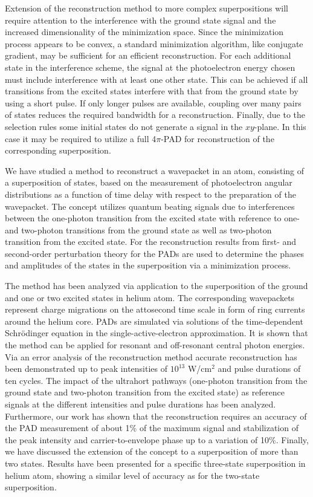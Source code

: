 Extension of the reconstruction method to more complex superpositions will require attention to the interference with the ground state signal and the increased dimensionality of the minimization space. Since the minimization process appears to be convex, a standard minimization algorithm, like conjugate gradient, may be sufficient for an efficient reconstruction. For each additional state in the interference scheme, the signal at the photoelectron energy chosen must include interference with at least one other state. This can be achieved if all transitions from the excited states interfere with that from the ground state by using a short pulse. If only longer pulses are available, coupling over many pairs of states reduces the required bandwidth for a reconstruction. Finally, due to the selection rules some initial states do not generate a signal in the $xy$-plane. In this case it may be required to utilize a full 4$\pi$-PAD for reconstruction of the corresponding superposition.


We have studied a method to reconstruct a wavepacket in an atom, consisting of a superposition of states, based on the measurement of photoelectron angular distributions as a function of time delay with respect to the preparation of the wavepacket. The concept utilizes quantum beating signals due to interferences between the one-photon transition from the excited state with reference to one- and two-photon transitions from the ground state as well as two-photon transition from the excited state. For the reconstruction results from first- and second-order perturbation theory for the PADs are used to determine the phases and amplitudes of the states in the superposition via a minimization process.

The method has been analyzed via application to the superposition of the ground and one or two excited states in helium atom. The corresponding wavepackets represent charge migrations on the attosecond time scale in form of ring currents around the helium core. PADs are simulated via solutions of the time-dependent Schr\"odinger equation in the single-active-electron approximation. It is shown that the method can be applied for resonant and off-resonant central photon energies. Via an error analysis of the reconstruction method accurate reconstruction has been demonstrated up to peak intensities of $10^{13}$ W/cm$^2$ and pulse durations of ten cycles. The impact of the ultrahort pathways (one-photon transition from the ground state and two-photon transition from the excited state) as reference signals at the different intensities and pulse durations has been analyzed. Furthermore, our work has shown that the reconstruction requires an accuracy of the PAD measurement of about 1\% of the maximum signal and stabilization of the peak intensity and carrier-to-envelope phase up to a variation of 10\%. Finally, we have discussed the extension of the concept to a superposition of more than two states. Results have been presented for a specific three-state superposition in helium atom, showing a similar level of accuracy as for the two-state superposition. 

